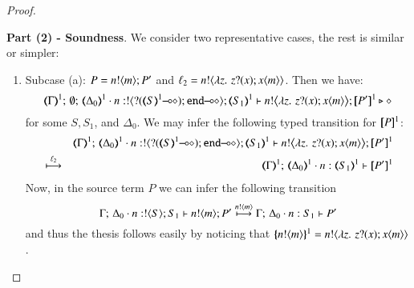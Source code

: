 \begin{proof}
\begin{enumerate}[1.]

%
		
\end{enumerate}
%
\noi \textbf{Part (2) - Soundness}. We consider two representative cases, the rest is similar or simpler:
%
\begin{enumerate}[1.]
	\item Subcase (a): $P = n ! \langle m \rangle ; P'$ and $\ell_2 = n ! \langle \lambda z.\,\,z ? (x) ; x\langle m \rangle \rangle$.
		Then 
		we have: %
%
		\[
			\mapt{\Gamma}^{1};\, \emptyset;\, \mapt{\Delta_0}^{1} \cat 
			n: \btout{\lhot{\btinp{\lhot{\tmap{S}{1}}}\tinact}} \tmap{S_1}{1} 
			\proves 
			 \bbout{n}{ \abs{z}{\,\binp{z}{x} \appl{x}{m}} } \pmap{P'}{1} 
			 \hastype \Proc
		\]
%
		for some $S, S_1$, and $\Delta_0$. 
		We may infer the following typed transition for $[\!\![P]\!\!]^{1}$:
%
		\begin{eqnarray*}
			& & \mapt{\Gamma}^{1};\, \mapt{\Delta_0}^{1} \cat n: \btout{\lhot{\btinp{\lhot{\tmap{S}{1}}}\tinact}} \tmap{S_1}{1} 
			\proves 
			 \bbout{n}{ \abs{z}{\,\binp{z}{x} \appl{x}{m}} } \pmap{P'}{1} 
			 \\
			&\hby{\ell_2}& 
			\mapt{\Gamma}^{1};\, \mapt{\Delta_0}^{1} \cat n: \tmap{S_1}{1} 
			\proves  \pmap{P'}{1} 
		\end{eqnarray*}
%
		Now, in the source term $P$ we can infer the following transition 
%
		\[
		\Gamma;\,  \Delta_0 \cdot n:! \langle S \rangle ; S_1 \vdash n ! \langle m \rangle ; P'
		 \stackrel{n ! \langle m \rangle}{\longmapsto} 
		 \Gamma;\,  \Delta_0 \cdot n: S_1 \vdash P'
		\]
%
		and thus the thesis follows easily by noticing that 
		$\{\!\!\{n ! \langle m \rangle\}\!\!\}^{1} = n ! \langle \lambda z.\,\,z ? (x) ; x\langle m \rangle \rangle$.



\end{enumerate}
\end{proof}
